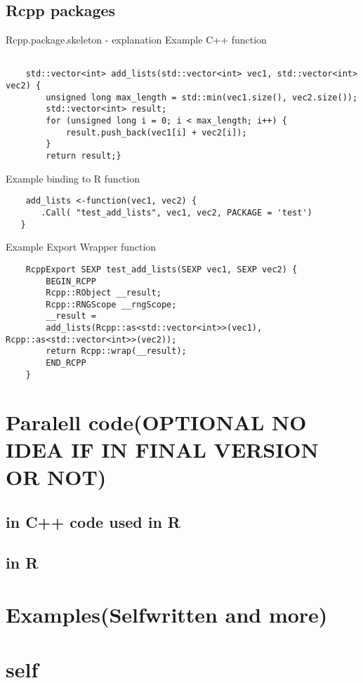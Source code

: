 \documentclass{article}
\begin{document}
    \subsection{Rcpp packages}
        Rcpp.package.skeleton - explanation
        \newline
        Example C++ function
            \begin{verbatim}

    std::vector<int> add_lists(std::vector<int> vec1, std::vector<int> vec2) {
        unsigned long max_length = std::min(vec1.size(), vec2.size());
        std::vector<int> result;
        for (unsigned long i = 0; i < max_length; i++) {
            result.push_back(vec1[i] + vec2[i]);
        }
        return result;}

            \end{verbatim}
        Example binding to R function
            \begin{verbatim}
    add_lists <-function(vec1, vec2) {
       .Call( "test_add_lists", vec1, vec2, PACKAGE = 'test')
   }
            \end{verbatim}
        Example Export Wrapper function
            \begin{verbatim}
    RcppExport SEXP test_add_lists(SEXP vec1, SEXP vec2) {
        BEGIN_RCPP
        Rcpp::RObject __result;
        Rcpp::RNGScope __rngScope;
        __result =
        add_lists(Rcpp::as<std::vector<int>>(vec1), Rcpp::as<std::vector<int>>(vec2));
        return Rcpp::wrap(__result);
        END_RCPP
    }
            \end{verbatim}

    \section{Paralell code(OPTIONAL NO IDEA IF IN FINAL VERSION OR NOT)}
        \subsection{in C++ code used in R}
        \subsection{in R}

    \section{Examples(Selfwritten and more)}
        \section{self}
            
\end{document}
